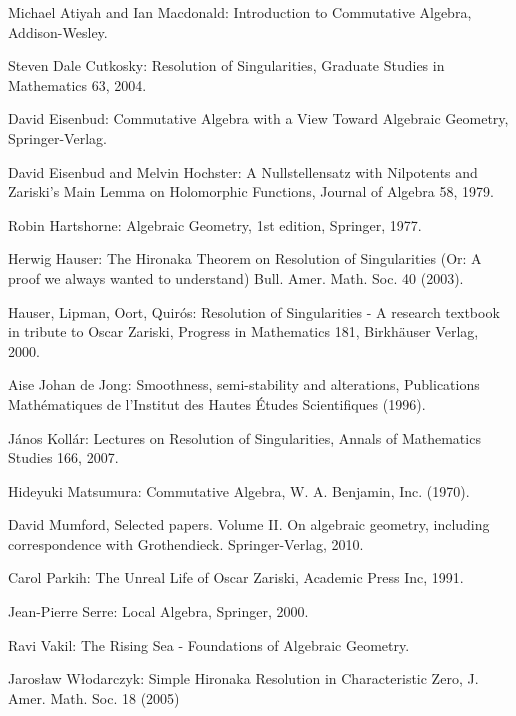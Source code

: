 \documentclass[12pt,a4paper,leqno]{article}
\theoremstyle{plain}
\theoremstyle{definition}
\theoremstyle{remark}
\begin{document}
\begin{thebibliography}{5, style=alpha}

Michael Atiyah and Ian Macdonald: Introduction to Commutative Algebra, Addison-Wesley.

Steven Dale Cutkosky: Resolution of Singularities, Graduate Studies in Mathematics 63, 2004.

David Eisenbud: Commutative Algebra with a View Toward Algebraic Geometry, Springer-Verlag.

David Eisenbud and Melvin Hochster: A Nullstellensatz with Nilpotents and Zariski's Main Lemma on Holomorphic Functions, Journal of Algebra 58, 1979.

Robin Hartshorne: Algebraic Geometry, 1st edition, Springer, 1977.

Herwig Hauser: The Hironaka Theorem on Resolution of Singularities (Or: A proof we always wanted to understand) Bull. Amer. Math. Soc. 40 (2003).

Hauser, Lipman, Oort, Quirós: Resolution of Singularities - A research textbook in tribute to Oscar Zariski, Progress in Mathematics 181, Birkhäuser Verlag, 2000.

Aise Johan de Jong: Smoothness, semi-stability and alterations, Publications Mathématiques de l’Institut des Hautes Études Scientifiques (1996).

János Kollár: Lectures on Resolution of Singularities, Annals of Mathematics Studies 166, 2007.

Hideyuki Matsumura: Commutative Algebra, W. A. Benjamin, Inc. (1970).

David Mumford, Selected papers. Volume II. On algebraic geometry, including correspondence with Grothendieck. Springer-Verlag, 2010.

 Carol Parkih: The Unreal Life of Oscar Zariski, Academic Press Inc, 1991.

Jean-Pierre Serre: Local Algebra, Springer, 2000.

Ravi Vakil: The Rising Sea - Foundations of Algebraic Geometry.

Jaros\l{}aw W\l{}odarczyk: Simple Hironaka Resolution in Characteristic Zero, J. Amer. Math. Soc. 18 (2005)
\end{thebibliography}
\end{document}
